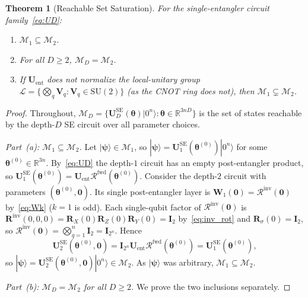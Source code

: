 \documentclass[11pt]{article}
\newcommand{\SU}{\mathrm{SU}}
\newcommand{\cM}{\mathcal{M}}
\newcommand{\bbR}{\mathbb{R}}
\newtheorem{theorem}{Theorem}[section]
\theoremstyle{plain}
\theoremstyle{plain}
\begin{document}
\begin{theorem}[Reachable Set Saturation]\label{thm:saturation}
  For the single-entangler circuit family~\eqref{eq:UD}:
  \begin{enumerate}[label=(\alph*)]
    \item $\cM_1\subseteq\cM_2$.
    \item For all $D\ge 2$, $\cM_D=\cM_2$.
    \item If $\mathbf{U}_{\mathrm{ent}}$ does not normalize the local-unitary
      group $\mathcal{L}=\{\bigotimes_q\mathbf{V}_q:\mathbf{V}_q\in\SU(2)\}$
      (as the CNOT ring does not), then $\cM_1\subsetneq\cM_2$.
  \end{enumerate}
\end{theorem}
\begin{proof}
Throughout, $\cM_D=\{\mathbf{U}_D^{\mathrm{SE}}(\bm\theta)|0^n\rangle:
\bm\theta\in\bbR^{3nD}\}$ is the set of states reachable by the
depth-$D$ SE circuit over all parameter choices.

\textit{Part~(a): $\cM_1\subseteq\cM_2$.}
Let $|\boldsymbol{\psi}\rangle\in\cM_1$, so
$|\boldsymbol{\psi}\rangle=\mathbf{U}_1^{\mathrm{SE}}(\bm\theta^{(0)})|0^n\rangle$ for
some $\bm\theta^{(0)}\in\bbR^{3n}$. By~\eqref{eq:UD} the depth-$1$
circuit has an empty post-entangler product, so
$\mathbf{U}_1^{\mathrm{SE}}(\bm\theta^{(0)})
=\mathbf{U}_{\mathrm{ent}} \mathcal{R}^{\mathrm{fwd}}(\bm\theta^{(0)})$.
Consider the depth-$2$ circuit with parameters
$(\bm\theta^{(0)},\bm 0)$. Its single post-entangler layer is
$\mathbf{W}_1(\bm 0)=\mathcal{R}^{\mathrm{inv}}(\bm 0)$ by~\eqref{eq:Wk}
($k=1$ is odd). Each single-qubit factor of
$\mathcal{R}^{\mathrm{inv}}(\bm 0)$ is
$\mathbf{R}^{\mathrm{inv}}(0,0,0)=\mathbf{R}_X(0)\mathbf{R}_Z(0)\mathbf{R}_Y(0)=\mathbf{I}_2$
by~\eqref{eq:inv_rot} and $\mathbf{R}_\sigma(0)=\mathbf{I}_2$, so
$\mathcal{R}^{\mathrm{inv}}(\bm 0)=\bigotimes_{q=1}^n\mathbf{I}_2=\mathbf{I}_{2^n}$.
Hence
\begin{equation}\label{eq:sat_a}
  \mathbf{U}_2^{\mathrm{SE}}(\bm\theta^{(0)},\bm 0)
  = \mathbf{I}_{2^n} \mathbf{U}_{\mathrm{ent}} 
    \mathcal{R}^{\mathrm{fwd}}(\bm\theta^{(0)})
  = \mathbf{U}_1^{\mathrm{SE}}(\bm\theta^{(0)}),
\end{equation}
so $|\boldsymbol{\psi}\rangle=\mathbf{U}_2^{\mathrm{SE}}(\bm\theta^{(0)},\bm 0)|0^n\rangle
\in\cM_2$. As $|\boldsymbol{\psi}\rangle$ was arbitrary, $\cM_1\subseteq\cM_2$.

\textit{Part~(b): $\cM_D=\cM_2$ for all $D\ge 2$.}
We prove the two inclusions separately.


\end{proof}
\end{document}
